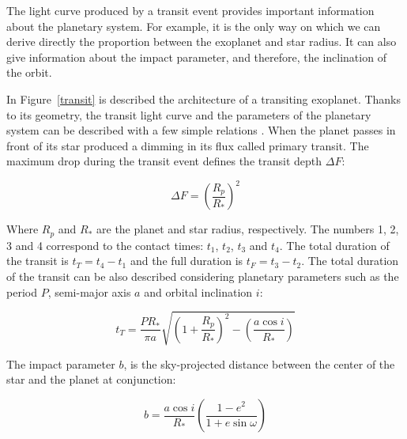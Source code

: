 
The light curve produced by a transit event provides important information about the planetary system. For example, it is the only way on which we can derive directly the proportion between the exoplanet and star radius. It can also give information about the impact parameter, and therefore, the inclination of the orbit. 

In Figure~\ref{transit} is described the architecture of a transiting exoplanet. Thanks to its geometry, the transit light curve and the parameters of the planetary system can be described with a few simple relations \cite{Seager2003,Winn2010}.  When the planet passes in front of its star produced a dimming in its flux called primary transit. The maximum drop during the transit event defines the transit depth $\Delta{F}$:

\begin{equation}
    \Delta{F} = \left(\frac{R_{p}}{R_{*}}\right)^2 
\end{equation}

Where $R_{p}$ and $R_{*}$ are the planet and star radius, respectively. The numbers 1, 2, 3 and 4 correspond to the contact times: $t_{1}$, $t_{2}$, $t_{3}$ and $t_{4}$. The total duration of the transit is $t_{T} = t_{4}-t_{1}$ and the full duration is $t_{F}=t_{3}-t_{2}$. The total duration of the transit can be also described considering planetary parameters such as the period $P$, semi-major axis $a$ and orbital inclination $i$:

\begin{equation}
    t_{T} = \frac{PR_{*}}{\pi a} \sqrt{\left(1+\frac{R_{p}}{R_{*}}\right)^2-\left(\frac{a\cos i}{R_{*}}\right)}
\end{equation}

The impact parameter $b$, is the sky-projected distance between the center of the star and the planet at conjunction:

\begin{equation}
    b = \frac{a\cos{i}}{R_{*}}\left(\frac{1-e^2}{1+e\sin{\omega}}\right)
\label{impact_param}
\end{equation}

